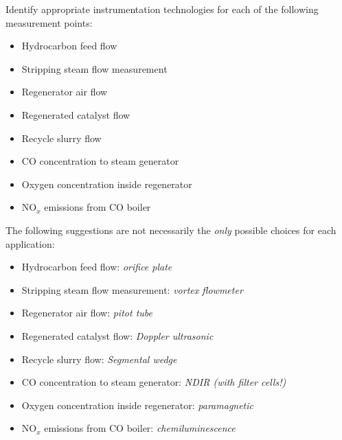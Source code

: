 \vskip 10pt

Identify appropriate instrumentation technologies for each of the following measurement points:

\begin{itemize}
\item{} Hydrocarbon feed flow
\item{} Stripping steam flow measurement
\item{} Regenerator air flow
\item{} Regenerated catalyst flow
\item{} Recycle slurry flow
\item{} CO concentration to steam generator
\item{} Oxygen concentration inside regenerator
\item{} NO$_{x}$ emissions from CO boiler
\end{itemize}







The following suggestions are not necessarily the {\it only} possible choices for each application:

\begin{itemize}
\item{} Hydrocarbon feed flow: {\it orifice plate}
\vskip 10pt
\item{} Stripping steam flow measurement: {\it vortex flowmeter}
\vskip 10pt
\item{} Regenerator air flow: {\it pitot tube}
\vskip 10pt
\item{} Regenerated catalyst flow: {\it Doppler ultrasonic}
\vskip 10pt
\item{} Recycle slurry flow: {\it Segmental wedge}
\vskip 10pt
\item{} CO concentration to steam generator: {\it NDIR (with filter cells!)}
\vskip 10pt
\item{} Oxygen concentration inside regenerator: {\it paramagnetic}
\vskip 10pt
\item{} NO$_{x}$ emissions from CO boiler: {\it chemiluminescence}
\end{itemize}












